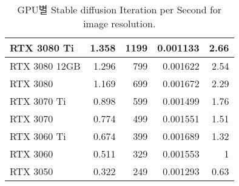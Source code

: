 \begin{table}[]
{\begin{tabular}{|l|r|r|r|r|}
RTX 3080 Ti   & 1.358                              & 1199                               & 0.001133                                                                                                        & 2.66                                                                                                          \\ \hline
RTX 3080 12GB & 1.296                              & 799                                & 0.001622                                                                                                        & 2.54                                                                                                          \\ \hline
RTX 3080      & 1.169                              & 699                                & 0.001672                                                                                                        & 2.29                                                                                                          \\ \hline
RTX 3070 Ti   & 0.898                              & 599                                & 0.001499                                                                                                        & 1.76                                                                                                          \\ \hline
RTX 3070      & 0.774                              & 499                                & 0.001551                                                                                                        & 1.51                                                                                                          \\ \hline
RTX 3060 Ti   & 0.674                              & 399                                & 0.001689                                                                                                        & 1.32                                                                                                          \\ \hline
RTX 3060      & 0.511                              & 329                                & 0.001553                                                                                                        & 1                                                                                                             \\ \hline
RTX 3050      & 0.322                              & 249                                & 0.001293                                                                                                        & 0.63                                                                                                          \\ \hline
\end{tabular}%
}
\caption{\label{stableresolutiongpubenchmarktable}GPU별 Stable diffusion Iteration per Second for image resolution.}
\end{table}

